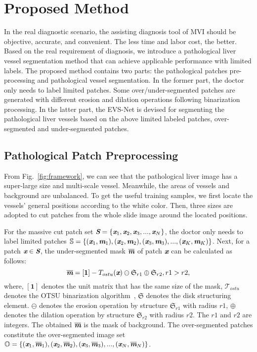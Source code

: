 \documentclass[letterpaper]{article} %
\begin{document}
\section{Proposed Method}
In the real diagnostic scenario, the assisting diagnosis tool of MVI should be objective, accurate, and convenient. The less time and labor cost, the better.
Based on the real requirement of diagnosis, we introduce a pathological liver vessel segmentation method that can achieve applicable performance with limited labels.
The proposed method contains two parts:
the pathological patches pre-processing and pathological vessel segmentation.
In the former part, the doctor only needs to label limited patches.
Some over/under-segmented patches are generated with different erosion and dilation operations following binarization processing. In the latter part,
the EVS-Net is devised for segmenting the pathological liver vessels based on the above limited labeled patches, over-segmented and under-segmented patches.


\subsection{Pathological Patch Preprocessing}
From Fig.~\ref{fig:framework}, we can see that the pathological liver image has a super-large size and multi-scale vessel.
Meanwhile, the areas of vessels and background are unbalanced. To get the useful training samples, we first locate the vessels' general positions according to the white color.
Then, three sizes are adopted to cut patches from the whole slide image around the located positions.

For the massive cut patch set $\textbf{\em S}=\{\textbf{\em x}_1,\textbf{\em x}_2,\textbf{\em x}_3,...,\textbf{\em x}_N\}$,
the doctor only needs to label limited patches $\mathbb{S}=\{(\textbf{\em x}_1,\textbf{\em m}_1), (\textbf{\em x}_2,\textbf{\em m}_2),(\textbf{\em x}_3,\textbf{\em m}_3), ..., (\textbf{\em x}_K,\textbf{\em m}_K)\}$.
Next, for a patch $\textbf{\em x}\in \textbf{\em S}$,
the under-segmented mask $\overline{\textbf{\em m}}$  of patch $\textbf{\em x}$  can be calculated as follows:
\begin{equation}\label{eq1}
\overline{\textbf{\em m}}=[\mathbf{1}] - T_{ostu}(\textbf{\em x})\ominus \mathfrak{S}_{r1} \oplus \mathfrak{S}_{r2}, r1>r2,
\end{equation}
where, $[\mathbf{1}]$ denotes the unit matrix that has the same size of the mask, $\mathcal{T}_{ostu}$ denotes the OTSU binarization algorithm~\cite{otsu1979a},
$\mathfrak{S}$ denotes the disk structuring element.
$\ominus$ denotes the erosion operation by structure $\mathfrak{S}_{r1}$ with radius $r1$,
$\oplus$ denotes the dilation operation by structure $\mathfrak{S}_{r2}$ with radius $r2$.
The $r1$ and $r2$ are integers.
The obtained $\overline{\textbf{\em m}}$ is the mask of background.
The over-segmented patches constitute the over-segmented image set $\mathbb{O}=\{(\textbf{\em x}_1,\overline{\textbf{\em m}}_1), (\textbf{\em x}_2,\overline{\textbf{\em m}}_2),(\textbf{\em x}_3,\overline{\textbf{\em m}}_3), ..., (\textbf{\em x}_N,\overline{\textbf{\em m}}_N)\}$.
\end{document}
